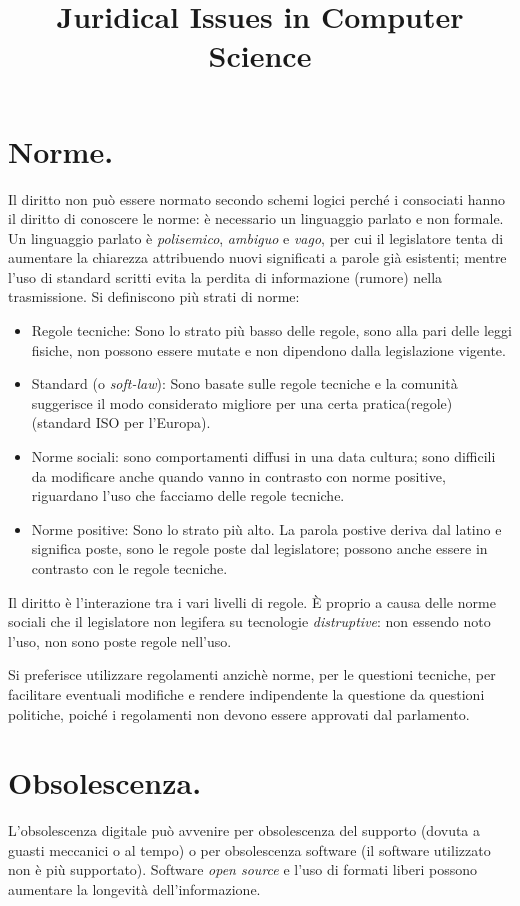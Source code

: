 \documentclass[a4page, 11pt, twocolumn]{article}
\title{Juridical Issues in Computer Science}
\date{}
\begin{document}
\maketitle

\section{Norme.}
Il diritto non può essere normato secondo schemi logici perché i consociati hanno il diritto di conoscere le norme: è necessario un linguaggio parlato e non formale.
Un linguaggio parlato è \textit{polisemico}, \textit{ambiguo} e \textit{vago}, per cui il legislatore tenta di aumentare la chiarezza attribuendo nuovi significati a parole già esistenti; mentre l'uso di standard scritti evita la perdita di informazione (rumore) nella trasmissione. \newline
Si definiscono più strati di norme:
\begin{itemize}
\item Regole tecniche: Sono lo strato più basso delle regole, sono alla pari delle leggi fisiche, non possono essere mutate e non dipendono dalla legislazione vigente. 
\item Standard (o \textit{soft-law}): Sono basate sulle regole tecniche e la comunità suggerisce il modo considerato migliore per una certa pratica(regole) (standard ISO per l'Europa).
\item Norme sociali: sono comportamenti diffusi in una data cultura; sono difficili da modificare anche quando vanno in contrasto con norme positive, riguardano l'uso che facciamo delle regole tecniche.
\item Norme positive: Sono lo strato più alto. La parola postive deriva dal latino e significa poste, sono le regole poste dal legislatore; possono anche essere in contrasto con le regole tecniche.
\end{itemize}
Il diritto è l'interazione tra i vari livelli di regole. \newline
È proprio a causa delle norme sociali che il legislatore non legifera su tecnologie \textit{distruptive}: non essendo noto l'uso, non sono poste regole nell'uso.

Si preferisce utilizzare regolamenti anzichè norme, per le questioni tecniche, per facilitare eventuali modifiche e rendere indipendente la questione da questioni politiche, poiché i regolamenti non devono essere approvati dal parlamento.

\section{Obsolescenza.}
L'obsolescenza digitale può avvenire per obsolescenza del supporto (dovuta a guasti meccanici o al tempo) o per obsolescenza software (il software utilizzato non è più supportato).
Software \textit{open source} e l'uso di formati liberi possono aumentare la longevità dell'informazione.
\end{document}
